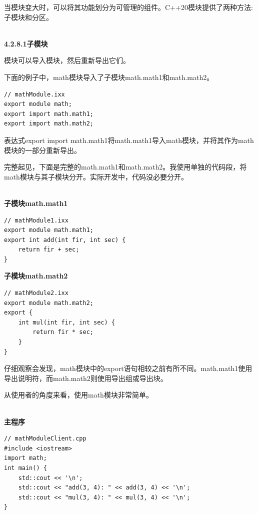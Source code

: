 
当模块变大时，可以将其功能划分为可管理的组件。C++20模块提供了两种方法:子模块和分区。

\hspace*{\fill} \\ %
\noindent
\textbf{4.2.8.1\hspace{0.2cm}子模块}

模块可以导入模块，然后重新导出它们。

下面的例子中，math模块导入了子模块math.math1和math.math2。

\begin{lstlisting}[style=styleCXX]
// mathModule.ixx
export module math;
export import math.math1;
export import math.math2;
\end{lstlisting}

表达式export import math.math1将math.math1导入math模块，并将其作为math模块的一部分重新导出。

完整起见，下面是完整的math.math1和math.math2。我使用单独的代码段，将math模块与其子模块分开。实际开发中，代码没必要分开。

\hspace*{\fill} \\ %
\noindent
\textbf{子模块math.math1}
\begin{lstlisting}[style=styleCXX]
// mathModule1.ixx
export module math.math1;
export int add(int fir, int sec) {
	return fir + sec;
}
\end{lstlisting}

\noindent
\textbf{子模块math.math2}
\begin{lstlisting}[style=styleCXX]
// mathModule2.ixx
export module math.math2;
export {
	int mul(int fir, int sec) {
		return fir * sec;
	}
}
\end{lstlisting}

仔细观察会发现，math模块中的export语句相较之前有所不同。math.math1使用导出说明符，而math.math2则使用导出组或导出块。

从使用者的角度来看，使用math模块非常简单。

\hspace*{\fill} \\ %
\noindent
\textbf{主程序}
\begin{lstlisting}[style=styleCXX]
// mathModuleClient.cpp
#include <iostream>
import math;
int main() {
	std::cout << '\n';
	std::cout << "add(3, 4): " << add(3, 4) << '\n';
	std::cout << "mul(3, 4): " << mul(3, 4) << '\n';
}
\end{lstlisting}

